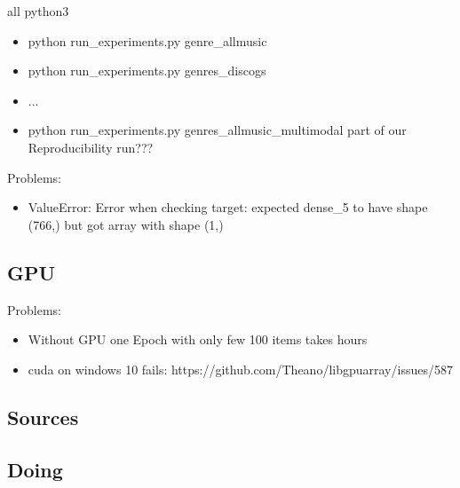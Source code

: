 \documentclass[sigconf,nonacm]{acmart}
\begin{document}
all python3

\begin{itemize}
  \item python run\_experiments.py genre\_allmusic
  \item python run\_experiments.py genres\_discogs
  \item ... 
  \item python run\_experiments.py genres\_allmusic\_multimodal part of our Reproducibility run???
\end{itemize}

Problems:
\begin{itemize}
  \item ValueError: Error when checking target: expected dense\_5 to have shape (766,) but got array with shape (1,)
\end{itemize}

\subsection{GPU}

Problems:

\begin{itemize}
  \item Without GPU one Epoch with only few 100 items takes hours
  \item cuda on windows 10 fails: https://github.com/Theano/libgpuarray/issues/587
\end{itemize}

\subsection{Sources}

\subsection{Doing}






\end{document}
